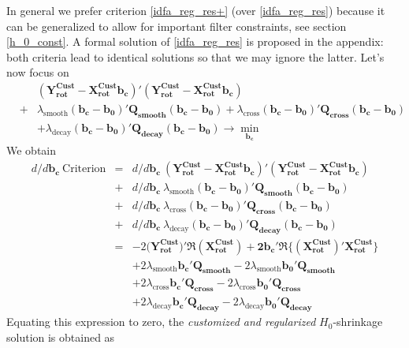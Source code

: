 \documentclass[11pt]{article}
\begin{document}
In general we prefer criterion \ref{idfa_reg_res+} (over \ref{idfa_reg_res}) because it can be generalized to allow for important filter constraints, see section \ref{h_0_const}. A formal solution of  \ref{idfa_reg_res} is proposed in the appendix: both criteria lead to identical solutions so that we may ignore the latter. Let's now focus on  
\begin{eqnarray*}
&&(\mathbf{Y_{\textrm{rot}}^{\textrm{Cust}}-X_{\textrm{rot}}^{\textrm{Cust}}b_c})'(\mathbf{Y_{\textrm{rot}}^{\textrm{Cust}}-X_{\textrm{rot}}^{\textrm{Cust}}b_c})\nonumber\\
&+&\lambda_{\textrm{smooth}}\mathbf{(b_c-b_0)'Q_{smooth}(b_c-b_0)}
+\lambda_{\textrm{cross}}\mathbf{(b_c-b_0)'Q_{cross}(b_c-b_0)}\nonumber\\
&&+\lambda_{\textrm{decay}}\mathbf{(b_c-b_0)'Q_{decay}(b_c-b_0)}\to\min_{\mathbf{b_c}}
\end{eqnarray*}
We obtain 
\begin{eqnarray*}
d/d\mathbf{b_c}~\textrm{Criterion}&=&d/d\mathbf{b_c}~(\mathbf{Y_{\textrm{rot}}^{\textrm{Cust}}-X_{\textrm{rot}}^{\textrm{Cust}}\mathbf{b_c}})'(\mathbf{Y_{\textrm{rot}}^{\textrm{Cust}}-X_{\textrm{rot}}^{\textrm{Cust}}\mathbf{b_c}})\nonumber\\
&+&d/d\mathbf{b_c}~\lambda_{\textrm{smooth}}\mathbf{\left(\mathbf{b_c-b_0}\right)'Q_{smooth}\left(\mathbf{b_c-b_0}\right)}\\
&+&d/d\mathbf{b_c}~\lambda_{\textrm{cross}}\mathbf{\left(\mathbf{b_c-b_0}\right)'Q_{cross}\left(\mathbf{b_c-b_0}\right)}\\
&+&d/d\mathbf{b_c}~\lambda_{\textrm{decay}}\mathbf{\left(\mathbf{b_c-b_0}\right)'Q_{decay}\left(\mathbf{b_c-b_0}\right)}\\
&=&-2(\mathbf{Y_{\textrm{rot}}^{\textrm{Cust}})'\Re\left(X_{\textrm{rot}}^{\textrm{Cust}}\right)
+2b_c'\Re\bigg\{(X_{\textrm{rot}}^{\textrm{Cust}})'X_{\textrm{rot}}^{\textrm{Cust}}\bigg\}}\\
&&+2\lambda_{\textrm{smooth}}\mathbf{b_c'Q_{smooth}}-2\lambda_{\textrm{smooth}}\mathbf{b_0'Q_{\textrm{smooth}}}\\
&&+2\lambda_{\textrm{cross}}\mathbf{b_c'Q_{cross}}-2\lambda_{\textrm{cross}}\mathbf{b_0'Q_{\textrm{cross}}}\\
&&+2\lambda_{\textrm{decay}}\mathbf{b_c'Q_{decay}}-2\lambda_{\textrm{decay}}\mathbf{b_0'Q_{\textrm{decay}}}
\end{eqnarray*}
Equating this expression to zero, the \emph{customized and regularized} $H_0$-shrinkage solution is obtained as
\end{document}
